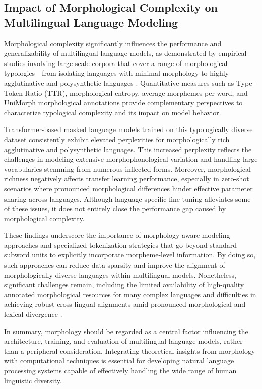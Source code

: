 \documentclass[sigconf]{acmart}
\begin{document}
\subsection{Impact of Morphological Complexity on Multilingual Language Modeling}

Morphological complexity significantly influences the performance and generalizability of multilingual language models, as demonstrated by empirical studies involving large-scale corpora that cover a range of morphological typologies—from isolating languages with minimal morphology to highly agglutinative and polysynthetic languages \cite{ref34}. Quantitative measures such as Type-Token Ratio (TTR), morphological entropy, average morphemes per word, and UniMorph morphological annotations provide complementary perspectives to characterize typological complexity and its impact on model behavior.

Transformer-based masked language models trained on this typologically diverse dataset consistently exhibit elevated perplexities for morphologically rich agglutinative and polysynthetic languages. This increased perplexity reflects the challenges in modeling extensive morphophonological variation and handling large vocabularies stemming from numerous inflected forms. Moreover, morphological richness negatively affects transfer learning performance, especially in zero-shot scenarios where pronounced morphological differences hinder effective parameter sharing across languages. Although language-specific fine-tuning alleviates some of these issues, it does not entirely close the performance gap caused by morphological complexity.

These findings underscore the importance of morphology-aware modeling approaches and specialized tokenization strategies that go beyond standard subword units to explicitly incorporate morpheme-level information. By doing so, such approaches can reduce data sparsity and improve the alignment of morphologically diverse languages within multilingual models. Nonetheless, significant challenges remain, including the limited availability of high-quality annotated morphological resources for many complex languages and difficulties in achieving robust cross-lingual alignments amid pronounced morphological and lexical divergence \cite{ref34}.

In summary, morphology should be regarded as a central factor influencing the architecture, training, and evaluation of multilingual language models, rather than a peripheral consideration. Integrating theoretical insights from morphology with computational techniques is essential for developing natural language processing systems capable of effectively handling the wide range of human linguistic diversity.
\end{document}
